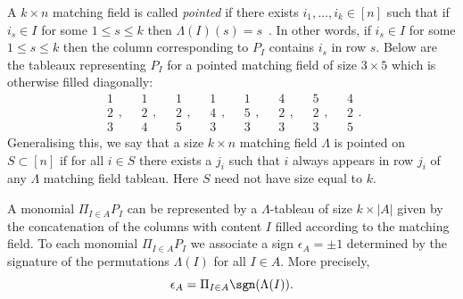 \begin{exam}\label{ex:pointed1}
A $k \times n$ matching field is called \emph{pointed} if there exists $i_1, \ldots, i_k \in [n]$ such that if $i_s \in I$ for some 
$1 \leq s \leq k$ then $\Lambda(I)(s) = s$~\cite[Example~1.4]{sturmfels1993maximal}. In other words, if $i_s \in I$ for some $1\leq s \leq k$ then the column corresponding to $P_I$ contains $i_s$ in row $s$. Below are the tableaux representing $P_I$ for a pointed matching field of size $3 \times 5$ which is otherwise filled diagonally:
\[
\begin{array}{c}1 \\2 \\ 3 \end{array} , \quad
\begin{array}{c} 1 \\2 \\4 \end{array},\quad
\begin{array}{c}1 \\2 \\ 5 \end{array} , \quad
\begin{array}{c}1 \\ 4 \\ 3 \end{array} ,\quad
\begin{array}{c}1 \\5 \\ 3\end{array} ,\quad
\begin{array}{c}4 \\ 2\\ 3 \end{array} ,\quad
\begin{array}{c}5 \\2 \\ 3\end{array} ,\quad
\begin{array}{c} 4 \\ 2 \\ 5 \end{array}. 
\]
Generalising this, we say that a size $k \times n$ matching field $\Lambda$ is pointed on $S \subset [n]$ if for all $i \in S$ there exists a $j_i$ such that $i$ always appears in row $j_i$ of any $\Lambda$ matching field tableau. 
Here $S$ need not have size equal to $k$. 
\end{exam}


A monomial $\Pi_{I \in A} P_I $ can be represented by a $\Lambda$-tableau of size $k \times |A|$ given by the concatenation of the columns with content $I$ filled according to the matching field. 
To each monomial $\Pi_{I \in A} P_I $ we associate a sign $\epsilon_{A} = \pm 1$ determined by the signature of the permutations $\Lambda(I)$ for all $I \in A$. More precisely, 
\[
\epsilon_{A} = \Pi_{I \in A} \sgn (\Lambda(I)).
\]


